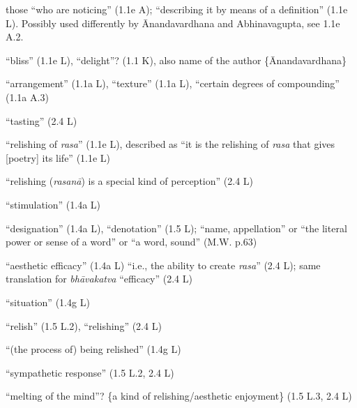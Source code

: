 \documentclass[10pt]{article}
\begin{document}
\begin{multicols}{2}
\begin{enumerate}[
			leftmargin=0em,
			rightmargin=0em,
		]
		 those ``who are noticing'' (1.1e A); ``describing it by means of a definition'' (1.1e L). Possibly used differently by Ānandavardhana and Abhinavagupta, see 1.1e A.2.

		 ``bliss'' (1.1e L), ``delight''? (1.1 K), also name of the author \{Ānandavardhana\}

		 ``arrangement'' (1.1a L), ``texture'' (1.1a L), ``certain degrees of compounding'' (1.1a A.3)



		 ``tasting'' (2.4 L)

		 ``relishing of \textit{rasa}'' (1.1e L),
		described as ``it is the relishing of \textit{rasa} that gives [poetry] its life'' (1.1e L)

		 ``relishing (\textit{rasanā}) is a special kind of perception'' (2.4 L)




		 ``stimulation'' (1.4a L)

		 ``designation'' (1.4a L),
		``denotation'' (1.5 L);
		``name, appellation'' or
		``the literal power or sense of a word'' or
		``a word, sound'' (M.W. p.63)

		 ``aesthetic efficacy'' (1.4a L)
		``i.e., the ability to create \textit{rasa}'' (2.4 L);
		same translation for \textit{bhāvakatva} ``efficacy'' (2.4 L) %

		 ``situation'' (1.4g L)

		 ``relish'' (1.5 L.2),
		``relishing'' (2.4 L)

		 ``(the process of) being relished'' (1.4g L)

		 ``sympathetic response'' (1.5 L.2, 2.4 L)

		 ``melting of the mind''? \{a kind of relishing/aesthetic enjoyment\} (1.5 L.3, 2.4 L)


\end{enumerate}
\end{multicols}
\end{document}

